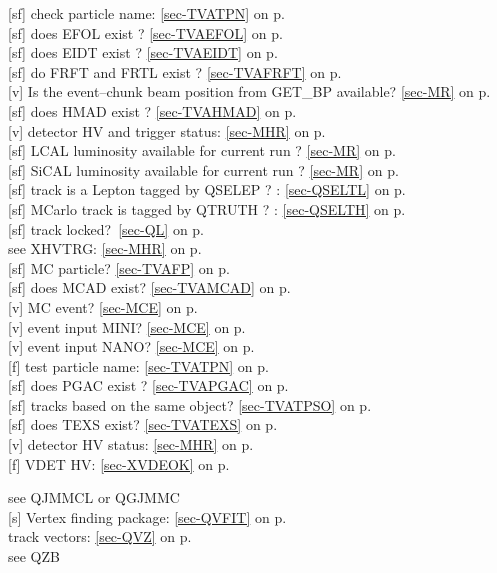  
 [sf] check particle name:
 \ref{sec-TVATPN} on p.~\pageref{sec-TVATPN}\\
 [sf] does EFOL exist ? \ref{sec-TVAEFOL} on p.~\pageref{sec-TVAEFOL}\\
 [sf] does EIDT exist ? \ref{sec-TVAEIDT} on p.~\pageref{sec-TVAEIDT}\\
 [sf] do FRFT and FRTL exist ? \ref{sec-TVAFRFT} on p.~\pageref{sec-TVAFRFT}\\
 [v] Is the event--chunk beam position from GET\_BP available?
 \ref{sec-MR} on p.~\pageref{sec-MR}\\
 [sf] does HMAD exist ? \ref{sec-TVAHMAD} on p.~\pageref{sec-TVAHMAD}\\
 [v]  detector HV and trigger status: \ref{sec-MHR} on p.~\pageref{sec-MHR}\\
 [sf] LCAL  luminosity available for current run ? \ref{sec-MR} on p.~\pageref{sec-MR}\\
 [sf] SiCAL luminosity available for current run ? \ref{sec-MR} on p.~\pageref{sec-MR}\\
 [sf] track is a Lepton tagged by QSELEP ? : \ref{sec-QSELTL} on p.~\pageref{sec-QSELTL}\\
 [sf] MCarlo track is tagged by QTRUTH ? : \ref{sec-QSELTH} on p.~\pageref{sec-QSELTH}\\
 [sf] track locked?~\ref{sec-QL} on p.~\pageref{sec-QL}\\
 see XHVTRG: \ref{sec-MHR} on p.~\pageref{sec-MHR}\\
 [sf] MC particle? \ref{sec-TVAFP} on p.~\pageref{sec-TVAFP}\\
 [sf] does MCAD exist? \ref{sec-TVAMCAD} on p.~\pageref{sec-TVAMCAD}\\
 [v] MC event? \ref{sec-MCE} on p.~\pageref{sec-MCE}\\
 [v] event input MINI? \ref{sec-MCE} on p.~\pageref{sec-MCE}\\
 [v] event input NANO? \ref{sec-MCE} on p.~\pageref{sec-MCE}\\
 [f] test particle name:
 \ref{sec-TVATPN} on p.~\pageref{sec-TVATPN}\\
 [sf] does PGAC exist ? \ref{sec-TVAPGAC} on p.~\pageref{sec-TVAPGAC}\\
 [sf] tracks based on the same object? \ref{sec-TVATPSO} on p.~\pageref{sec-TVATPSO}\\
 [sf] does TEXS exist? \ref{sec-TVATEXS} on p.~\pageref{sec-TVATEXS}\\
 [v] detector HV status: \ref{sec-MHR} on p.~\pageref{sec-MHR}\\
 [f] VDET HV: \ref{sec-XVDEOK} on p.~\pageref{sec-XVDEOK}
 
 see QJMMCL or QGJMMC\\
 [s] Vertex finding package: \ref{sec-QVFIT} on p.~\pageref{sec-QVFIT}\\
 track vectors: \ref{sec-QVZ} on p.~\pageref{sec-QVZ}\\
 see QZB


